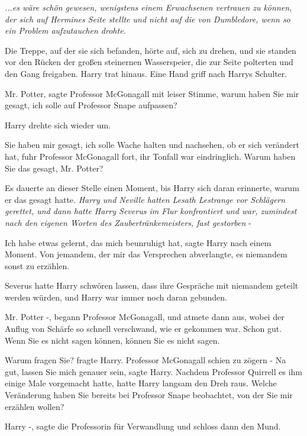 \emph{...es wäre schön gewesen, wenigstens einem Erwachsenen vertrauen zu können, der sich auf Hermines Seite stellte und nicht auf die von Dumbledore, wenn so ein Problem aufzutauchen drohte.}

Die Treppe, auf der sie sich befanden, hörte auf, sich zu drehen, und sie
standen vor den Rücken der großen steinernen Wasserspeier, die zur Seite
polterten und den Gang freigaben. Harry trat hinaus. Eine Hand griff nach Harrys
Schulter.

\glqq Mr. Potter\grqq{}, sagte Professor McGonagall mit leiser Stimme, \glqq
warum haben Sie mir gesagt, ich solle auf Professor Snape aufpassen?\grqq{}

Harry drehte sich wieder um.

\glqq Sie haben mir gesagt, ich solle Wache halten und nachsehen, ob er sich
verändert hat\grqq{}, fuhr Professor McGonagall fort, ihr Tonfall war
eindringlich. \glqq Warum haben Sie das gesagt, Mr. Potter?\grqq{}

Es dauerte an dieser Stelle einen Moment, bis Harry sich daran erinnerte, warum
er das gesagt hatte. \emph{Harry und Neville hatten Lesath Lestrange vor
Schlägern gerettet, und dann hatte Harry Severus im Flur konfrontiert und war,
zumindest nach den eigenen Worten des Zaubertränkemeisters, \glqq fast
gestorben\grqq{} }-

\glqq Ich habe etwas gelernt, das mich beunruhigt hat\grqq{}, sagte Harry nach
einem Moment. \glqq Von jemandem, der mir das Versprechen abverlangte, es
niemandem sonst zu erzählen.\grqq{}

Severus hatte Harry schwören lassen, dass ihre Gespräche mit niemandem geteilt
werden würden, und Harry war immer noch daran gebunden.

\glqq Mr. Potter -\grqq{}, begann Professor McGonagall, und atmete dann aus,
wobei der Anflug von Schärfe so schnell verschwand, wie er gekommen war. \glqq
Schon gut. Wenn Sie es nicht sagen können, können Sie es nicht sagen.\grqq{}

\glqq Warum fragen Sie?\grqq{} fragte Harry. Professor McGonagall schien zu
zögern - \glqq Na gut, lassen Sie mich genauer sein\grqq{}, sagte Harry. Nachdem
Professor Quirrell es ihm einige Male vorgemacht hatte, hatte Harry langsam den
Dreh raus. \glqq Welche Veränderung haben Sie bereits bei Professor Snape
beobachtet, von der Sie mir erzählen wollen?\grqq{}

\glqq Harry -\grqq{}, sagte die Professorin für Verwandlung und schloss dann den
Mund.

